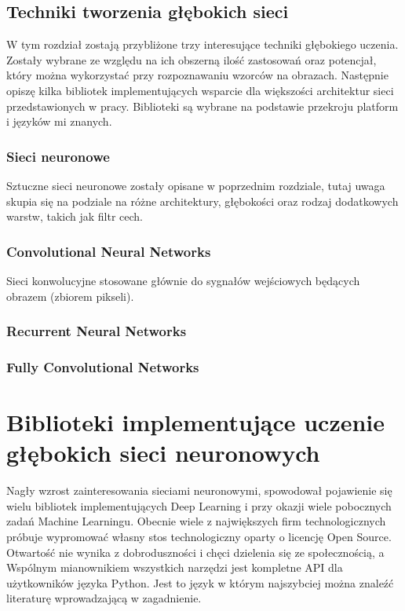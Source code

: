 \documentclass[12pt,a4paper,twoside,titlepage,openright]{book}
\begin{document}
\section{Techniki tworzenia głębokich sieci}
W tym rozdział zostają przybliżone trzy interesujące techniki głębokiego uczenia. Zostały wybrane ze względu na ich obszerną ilość zastosowań oraz potencjał, który można wykorzystać przy rozpoznawaniu wzorców na obrazach. Następnie opiszę kilka bibliotek implementujących wsparcie dla większości architektur sieci przedstawionych w pracy. Biblioteki są wybrane na podstawie przekroju platform i języków mi znanych. 

\subsection{Sieci neuronowe}
Sztuczne sieci neuronowe zostały opisane w poprzednim rozdziale, tutaj uwaga skupia się na podziale na różne architektury, głębokości oraz rodzaj dodatkowych warstw, takich jak filtr cech.

\subsection{Convolutional Neural Networks}
Sieci konwolucyjne stosowane głównie do sygnałów wejściowych będących obrazem (zbiorem pikseli). 
\subsection{Recurrent Neural Networks}

\subsection{Fully Convolutional Networks}


\chapter{Biblioteki implementujące uczenie głębokich sieci neuronowych}
Nagły wzrost zainteresowania sieciami neuronowymi, spowodował pojawienie się wielu bibliotek implementujących Deep Learning i przy okazji wiele pobocznych zadań Machine Learningu. Obecnie wiele z największych firm technologicznych próbuje wypromować własny stos technologiczny oparty o licencję Open Source. Otwartość nie wynika z dobroduszności i chęci dzielenia się ze społecznością, a  Wspólnym mianownikiem wszystkich narzędzi jest kompletne API dla użytkowników języka Python. Jest to język w którym najszybciej można znaleźć literaturę wprowadzającą w zagadnienie.
\end{document}
